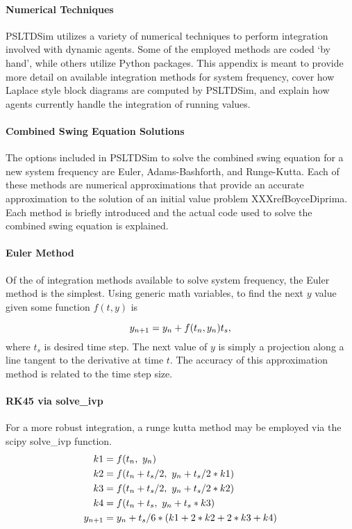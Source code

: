 \documentclass[12pt]{article}
\begin{document}
\paragraph{Numerical Techniques} %
PSLTDSim utilizes a variety of numerical techniques to perform integration involved with dynamic agents.
Some of the employed methods are coded `by hand', while others utilize Python packages.
This appendix is meant to 
provide more detail on available integration methods for system frequency,
cover how Laplace style block diagrams are computed by PSLTDSim, 
and explain how agents currently handle the integration of running values.



\paragraph{Combined Swing Equation Solutions}
The options included in PSLTDSim to solve the combined swing equation for a new system frequency are Euler, Adams-Bashforth, and Runge-Kutta.
Each of these methods are numerical approximations that provide an accurate approximation to the solution of an initial value problem XXXrefBoyceDiprima.
Each method is briefly introduced and the actual code used to solve the combined swing equation is explained.

\paragraph{Euler Method}
Of the of integration methods available to solve system frequency, the Euler method is the simplest.
Using generic math variables, to find the next $y$ value given some function $f(t, y)$ is

\begin{equation}{\label{eq: generic euler} }
y_{n+1} = y_n + f(t_n, y_n)t_s,
\end{equation}%
\noindent where $t_s$ is desired time step.
The next value of $y$ is simply a projection along a line tangent to the derivative at time $t$.
The accuracy of this approximation method is related to the time step size.

\paragraph{RK45 via solve\_ivp}
For a more robust integration, a runge kutta method may be employed via the scipy solve\_ivp function.
\begin{equation}{\label{eq: rk45 int} }
\begin{aligned}
    k1 &= f(t_n, \ y_n)\\
    k2 &= f(t_n+t_s/2, \ y_n+t_s/2*k1)\\
    k3 &= f(t_n+t_s/2, \ y_n+t_s/2*k2)\\
    k4 &= f(t_n+t_s, \ y_n+t_s*k3)\\
    y_{n+1} &= y_n + t_s/6*(k1+2*k2+2*k3+k4)    
    \end{aligned}
\end{equation}%
\end{document}
